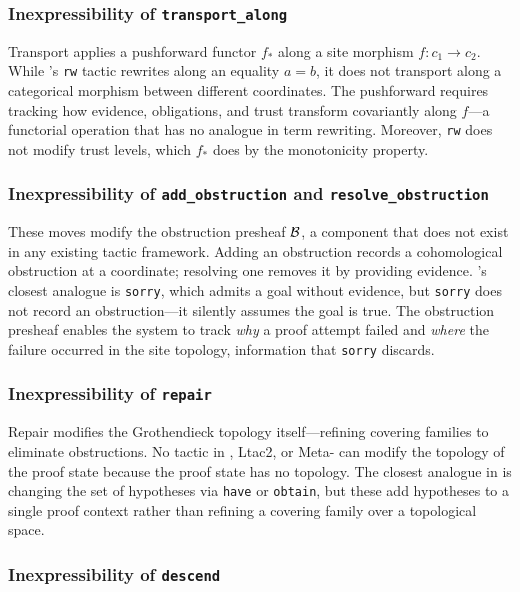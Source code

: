 \documentclass[11pt]{article}
\begin{document}
\subsubsection{Inexpressibility of \texttt{transport\_along}}

Transport applies a pushforward functor $f_*$ along a site
morphism $f: c_1 \to c_2$.  While \LEAN's \texttt{rw}
tactic rewrites along an equality $a = b$, it does not
transport along a categorical morphism between different
coordinates.  The pushforward requires tracking how evidence,
obligations, and trust transform covariantly along $f$---a
functorial operation that has no analogue in term rewriting.
Moreover, \texttt{rw} does not modify trust levels, which
$f_*$ does by the monotonicity property.

\subsubsection{Inexpressibility of \texttt{add\_obstruction}
and \texttt{resolve\_obstruction}}

These moves modify the obstruction presheaf $\mathcal{B}$, a
component that does not exist in any existing tactic framework.
Adding an obstruction records a cohomological obstruction at
a coordinate; resolving one removes it by providing evidence.
\LEAN's closest analogue is \texttt{sorry}, which admits a
goal without evidence, but \texttt{sorry} does not record
an obstruction---it silently assumes the goal is true.
The obstruction presheaf enables the system to track
\emph{why} a proof attempt failed and \emph{where} the
failure occurred in the site topology, information that
\texttt{sorry} discards.

\subsubsection{Inexpressibility of \texttt{repair}}

Repair modifies the Grothendieck topology itself---refining
covering families to eliminate obstructions.  No tactic in
\LEAN, Ltac2, or Meta-\Fstar{} can modify the topology of
the proof state because the proof state has no topology.
The closest analogue in \LEAN{} is changing the set of
hypotheses via \texttt{have} or \texttt{obtain}, but these
add hypotheses to a single proof context rather than refining
a covering family over a topological space.

\subsubsection{Inexpressibility of \texttt{descend}}
\end{document}

